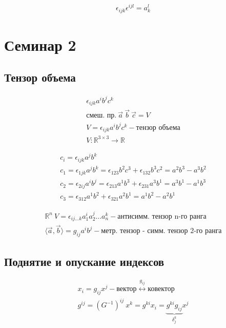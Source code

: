 $$\begin{gather}
\epsilon_{ijk}\epsilon^{ijl} = a_{k}^{l}
\end{gather}$$

\section{Семинар 2}

\subsection{Тензор
объема}

$$\begin{gather} \epsilon_{ijk}a^{i}b^{j}c^{k} \\
\text{смеш. пр.} \ \vec{a} \ \vec{b} \ \vec{c} = V \\
V = \epsilon_{ijk}a^{i}b^{j}c^{k} - \text{тензор объема} \\
V: \mathbb{R}^{3\times 3} \to \mathbb{R}
\end{gather}$$

$$\begin{gather}
c_{i} = \epsilon_{ijk}a^{j}b^{k} \\
c_{1} = \epsilon_{1jk}a^{j}b^{k} = \epsilon_{123}b^{2}c^{3} + \epsilon_{132}b^{3}c^{2} = a^{2}b^{3} - a^{3}b^{2} \\
c_{2} = \epsilon_{2ij} a^{i} b^{j} = \epsilon_{213} a^{1}b^{3} + \epsilon_{231} a^{3}b^{1} = a^{3}b^{1} - a^{1}b^{3} \\
c_{3} = \epsilon_{312}a^{1}b^{2} + \epsilon_{321}a^{2}b^{1} = a^{1}b^{2} - a^{2}b^{1}
\end{gather}$$

$$\begin{gather}
\mathbb{R}^{n} \ V = \epsilon_{ij\dots k}a^{i}_{1}a^{j}_{2}\dots a^{k}_{n} - \text{антисимм. тензор n-го ранга} \\
\langle \vec{a},\vec{b} \rangle = g_{ij}a^{i}b^{j} - \text{метр. тензор - симм. тензор 2-го ранга}
\end{gather}$$

\subsection{Поднятие и опускание
индексов}

$$\begin{gather}
x_{i} = g_{ij}x^{j} - \text{вектор} \overset{g_{ij}}{\leftrightarrow} \text{ковектор} \\
g^{ij} = (G^{-1})^{ij} \ x^{k} = g^{ki}x_{i} = \underbrace{g^{ki}g_{ij}}_{\delta_{j}^{k}}x^{j}
\end{gather}$$

